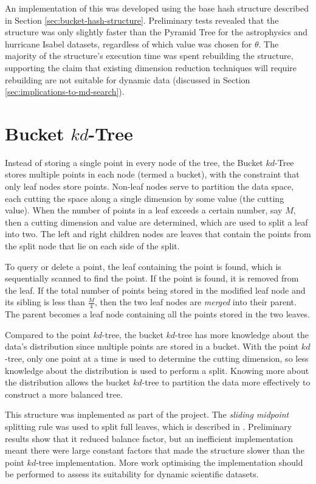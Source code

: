 An implementation of this was developed using the base hash structure described in Section \ref{sec:bucket-hash-structure}. Preliminary tests revealed that the structure was only slightly faster than the Pyramid Tree for the astrophysics and hurricane Isabel datasets, regardless of which value was chosen for $\theta$. The majority of the structure's execution time was spent rebuilding the structure, supporting the claim that existing dimension reduction techniques will require rebuilding are not suitable for dynamic data (discussed in Section \ref{sec:implications-to-md-search}).

\section{Bucket $kd$-Tree}

Instead of storing a single point in every node of the tree, the Bucket $kd$-Tree stores multiple points in each node (termed a bucket), with the constraint that only leaf nodes store points. Non-leaf nodes serve to partition the data space, each cutting the space along a single dimension by some value (the cutting value). When the number of points in a leaf exceeds a certain number, say $M$, then a cutting dimension and value are determined, which are used to split a leaf into two. The left and right children nodes are leaves that contain the points from the split node that lie on each side of the split.

To query or delete a point, the leaf containing the point is found, which is sequentially scanned to find the point. If the point is found, it is removed from the leaf. If the total number of points being stored in the modified leaf node and its sibling is less than $\frac{M}{4}$, then the two leaf nodes are \textit{merged} into their parent. The parent becomes a leaf node containing all the points stored in the two leaves.

Compared to the point $kd$-tree, the bucket $kd$-tree has more knowledge about the data's distribution since multiple points are stored in a bucket. With the point $kd$-tree, only one point at a time is used to determine the cutting dimension, so less knowledge about the distribution is used to perform a split. Knowing more about the distribution allows the bucket $kd$-tree to partition the data more effectively to construct a more balanced tree.

This structure was implemented as part of the project. The \textit{sliding midpoint} splitting rule was used to split full leaves, which is described in \cite{sliding-midpoint-split}. Preliminary results show that it reduced balance factor, but an inefficient implementation meant there were large constant factors that made the structure slower than the point $kd$-tree implementation. More work optimising the implementation should be performed to assess its suitability for dynamic scientific datasets.